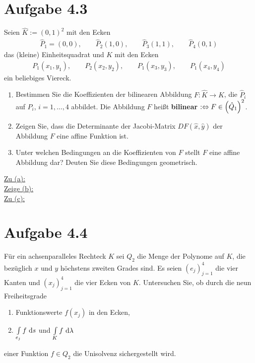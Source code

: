 \documentclass[12pt,a4paper]{article}
\begin{document}
\section*{Aufgabe 4.3}
Seien $\hat{K}:=(0,1)^2$ mit den Ecken 
\begin{align*}
\hat{P}_1=(0,0),\qquad
\hat{P}_2(1,0),\qquad
\hat{P}_3(1,1),\qquad
\hat{P}_4(0,1)
\end{align*}
das (kleine) Einheitsquadrat und $K$ mit den Ecken
\begin{align*}
P_1(x_1,y_1),\qquad
P_2(x_2,y_2),\qquad
P_1(x_3,y_3),\qquad
P_1(x_4,y_4)
\end{align*}
ein beliebiges Viereck.
\begin{enumerate}[label=(\alph*)]
\item Bestimmen Sie die Koeffizienten der bilinearen Abbildung $F:\hat{K}\to K$, die $\hat{P}_i$ auf $P_i$, $i=1,\ldots,4$ abbildet. Die Abbildung $F$ heißt \textbf{bilinear} $:\Leftrightarrow F\in\left(\hat{Q}_1\right)^2$.
\item Zeigen Sie, dass die Determinante der Jacobi-Matrix $DF(\hat{x},\hat{y})$ der Abbildung $F$ eine affine Funktion ist.
\item Unter welchen Bedingungen an die Koeffizienten von $F$ stellt $F$ eine affine Abbildung dar? Deuten Sie diese Bedingungen geometrisch.
\end{enumerate}

\begin{lösung}
\underline{Zu (a):}\\

\underline{Zeige (b):}\\

\underline{Zu (c):}\\

\end{lösung}

\section*{Aufgabe 4.4}
Für ein achsenparalleles Rechteck $K$ sei $Q_2$ die Menge der Polynome auf $K$, die bezüglich $x$ und $y$ höchstens zweiten Grades sind. Es seien $(e_j)_{j=1}^4$ die vier Kanten und $(x_j)_{j=1}^4$ die vier Ecken von $K$. Untersuchen Sie, ob durch die neun Freiheitsgrade
\begin{enumerate}[label=\roman*]
\item Funktionswerte $f(x_j)$ in den Ecken,
\item $\int\limits_{e_j} f\text{ d} s$ und $\int\limits_K f\text{ d}\lambda$
\end{enumerate}
einer Funktion $f\in Q_2$ die Unisolvenz sichergestellt wird.
\end{document}
